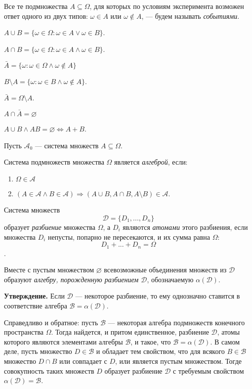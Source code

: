\documentclass{article}
\begin{document}
Все те подмножества $A\subseteq\Omega$, для которых по условиям эксперимента возможен ответ одного из двух типов: $\omega\in A$ или $\omega\notin A$, --- будем называть \textit{событиями}\cite[29]{sh}.

$A\cup B=\{\omega\in\Omega: \omega\in A \lor \omega\in B\}$.

$A\cap B=\{\omega\in\Omega:\omega\in A \land \omega\in B\}$.

$\bar A=\{\omega: \omega\in\Omega\land\omega\notin A\}$

$B\setminus A=\{\omega:\omega\in B\land\omega\notin A\}$.

$\bar A=\Omega\setminus A$.

$A\cap\bar A=\varnothing$

$A\cup B \land AB=\varnothing \Leftrightarrow A+B$.

Пусть $\mathscr{A}_0$ --- система множеств $A\subseteq \Omega$.

Система подмножеств множества $\Omega$ является \textit{алгеброй}, если:
\begin{enumerate}
	\item $\Omega\in\mathscr{A}$
	\item 
		$(
		A\in\mathscr{A} \land B\in\mathscr{A})
		\Rightarrow
		(A\cup{B}, A\cap{B}, A\setminus{B})
		\in\mathscr{A}$.
\end{enumerate}

Система множеств
$$\mathscr{D}=\{D_1,...,D_n\}$$
образует \textit{разбиение} множества $\Omega$, а $D_i$ являются \textit{атомами} этого разбиения, если множества $D_i$ непусты, попарно не пересекаются, и их сумма равна $\Omega$:
$$D_1+...+D_n=\Omega$$.

Вместе с пустым множеством $\varnothing$ всевозможные объединения множеств из $\mathscr D$ образуют \textit{алгебру, порожденную разбиением $\mathscr D$}, обозначаемую $\alpha(\mathscr D)$.

\textbf{Утверждение.}
Если $\mathscr{D}$ --- некоторое разбиение, то ему однозначно ставится в соответствие алгебра $\mathscr{B}=\alpha(\mathscr{D})$.

Справедливо и обратное: пусть $\mathscr B$ --- некоторая алгебра подмножеств конечного пространства $\Omega$. Тогда найдется, и притом единственное, разбиение $\mathscr D$, атомы которого являются элементами алгебры $\mathscr B$, и такое, что $\mathscr B=\alpha(\mathscr D)$.
В самом деле, пусть множество $D\in\mathscr B$ и обладает тем свойством, что для всякого $B\in\mathscr B$ множество $D\cap B$ или совпадает с $D$, или является пустым множеством.
Тогде совокупность таких множеств $D$ образует разбиение $\mathscr D$ с требуемым свойством $\alpha(\mathscr D)=\mathscr B$.
\end{document}
